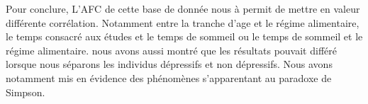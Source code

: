 Pour conclure, L'AFC de cette base de donnée nous à permit de mettre en valeur différente corrélation.
Notamment entre la tranche d'age et le régime alimentaire, le temps consacré aux études et le temps de sommeil ou le temps de sommeil et le régime alimentaire.
nous avons aussi montré que les résultats pouvait différé lorsque nous séparons les individus dépressifs et non dépressifs. Nous avons notamment mis en évidence des phénomènes s'apparentant au paradoxe de Simpson.